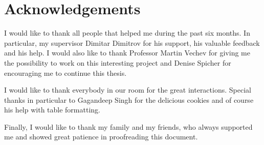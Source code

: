 \chapter{Acknowledgements}

I would like to thank all people that helped me during the past six months. In particular, my supervisor Dimitar Dimitrov for his support, his valuable feedback and his help. I would also like to thank Professor Martin Vechev for giving me the possibility to work on this interesting project and Denise Spicher for encouraging me to continue this thesis.

I would like to thank everybody in our room for the great interactions. Special thanks in particular to Gagandeep Singh for the delicious cookies and of course his help with table formatting.

Finally, I would like to thank my family and my friends, who always supported me and showed great patience in proofreading this document.